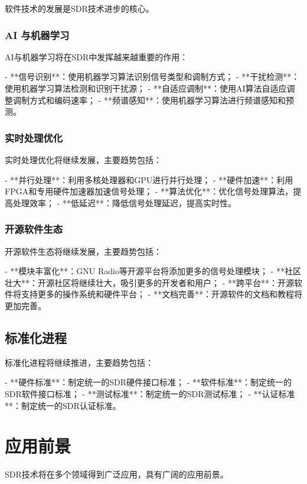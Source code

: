 ﻿\documentclass[UTF8]{ctexbook}
\begin{document}
软件技术的发展是SDR技术进步的核心。

\subsubsection{AI 与机器学习}

AI与机器学习将在SDR中发挥越来越重要的作用：

- **信号识别**：使用机器学习算法识别信号类型和调制方式；
- **干扰检测**：使用机器学习算法检测和识别干扰源；
- **自适应调制**：使用AI算法自适应调整调制方式和编码速率；
- **频谱感知**：使用机器学习算法进行频谱感知和预测。

\subsubsection{实时处理优化}

实时处理优化将继续发展，主要趋势包括：

- **并行处理**：利用多核处理器和GPU进行并行处理；
- **硬件加速**：利用FPGA和专用硬件加速器加速信号处理；
- **算法优化**：优化信号处理算法，提高处理效率；
- **低延迟**：降低信号处理延迟，提高实时性。

\subsubsection{开源软件生态}

开源软件生态将继续发展，主要趋势包括：

- **模块丰富化**：GNU Radio等开源平台将添加更多的信号处理模块；
- **社区壮大**：开源社区将继续壮大，吸引更多的开发者和用户；
- **跨平台**：开源软件将支持更多的操作系统和硬件平台；
- **文档完善**：开源软件的文档和教程将更加完善。

\subsection{标准化进程}

标准化进程将继续推进，主要趋势包括：

- **硬件标准**：制定统一的SDR硬件接口标准；
- **软件标准**：制定统一的SDR软件接口标准；
- **测试标准**：制定统一的SDR测试标准；
- **认证标准**：制定统一的SDR认证标准。

\section{应用前景}

SDR技术将在多个领域得到广泛应用，具有广阔的应用前景。
\end{document}

